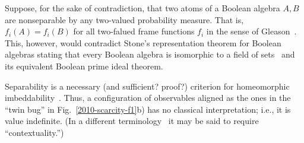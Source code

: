 \documentclass[pra,amsfonts,showpacs,showkeys,preprint]{revtex4}%
\begin{document}
Suppose, for the sake of contradiction, that two atoms of a Boolean algebra $A,B$ are nonseparable by any two-valued probability measure.
That is, $f_i(A)=f_i(B)$ for all two-falued frame functions $f_i$ in the sense of Gleason~\cite{Gleason}.
This, however, would contradict Stone's representation theorem for Boolean algebras stating that every Boolean algebra is isomorphic to a field of sets~\cite{stone}
and its  equivalent Boolean prime ideal theorem.

Separability is a necessary (and sufficient? proof?) criterion for homeomorphic imbeddability~\cite{kochen1,CalHerSvo}.
Thus, a configuration of observables aligned as the ones in the ``twin bug'' in Fig.~\ref{2010-scarcity-f1}b)
has no classical interpretation; i.e., it is value indefinite.
(In a different terminology~\cite{bohr-1949,bell-66,hey-red,redhead,cabello:210401,Bartosik-09} it may be said to require ``contextuality.'')
\end{document}

